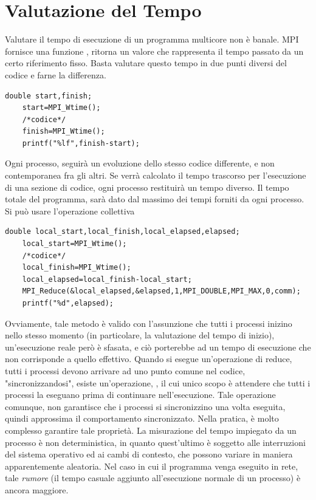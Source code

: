 \documentclass[10pt, letterpaper]{report}
\begin{document}
\section{Valutazione del Tempo}
Valutare il tempo di esecuzione di un programma multicore 
non è banale. MPI fornisce una funzione , 
ritorna un valore che rappresenta il tempo passato da un certo 
riferimento fisso. Basta valutare questo tempo in due punti diversi 
del codice e farne la differenza.
\begin{lstlisting}[style=CStyle]
    double start,finish;
    start=MPI_Wtime();
    /*codice*/
    finish=MPI_Wtime();
    printf("%lf",finish-start);
\end{lstlisting}
Ogni processo, seguirà un evoluzione dello stesso codice differente, e 
non contemporanea fra gli altri. Se verrà calcolato il tempo 
trascorso per l'esecuzione di una sezione di codice, ogni processo 
restituirà un tempo diverso. Il tempo totale del programma, sarà 
dato dal massimo dei tempi forniti da ogni processo. Si può usare 
l'operazione collettiva 
\begin{lstlisting}[style=CStyle]
    double local_start,local_finish,local_elapsed,elapsed;
    local_start=MPI_Wtime();
    /*codice*/
    local_finish=MPI_Wtime();
    local_elapsed=local_finish-local_start;
    MPI_Reduce(&local_elapsed,&elapsed,1,MPI_DOUBLE,MPI_MAX,0,comm);
    printf("%d",elapsed);
\end{lstlisting}
Ovviamente, tale metodo è valido con l'assunzione che tutti i processi 
inizino nello stesso momento (in particolare, la valutazione del 
tempo di inizio), un'esecuzione reale però è sfasata, e 
ciò porterebbe ad un tempo di esecuzione che non corrisponde a quello 
effettivo.\acc 
Quando si esegue un'operazione di reduce, tutti i processi 
devono arrivare ad uno punto comune nel codice, "sincronizzandosi", 
esiste un'operazione, , il cui unico scopo è attendere che tutti i processi 
la eseguano prima di continuare nell'esecuzione. Tale operazione comunque, 
non garantisce che i processi si sincronizzino una volta eseguita, quindi 
approssima il comportamento sincronizzato. Nella pratica, è molto 
complesso garantire tale proprietà.\acc 
La misurazione del tempo impiegato da un processo è 
non deterministica, in quanto quest'ultimo è 
soggetto alle interruzioni del sistema operativo ed ai cambi di 
contesto, che possono variare in maniera apparentemente aleatoria. Nel 
caso in cui il programma venga eseguito in rete, tale \textit{rumore} 
(il tempo casuale aggiunto all'esecuzione normale di un processo) è ancora maggiore.
\end{document}
